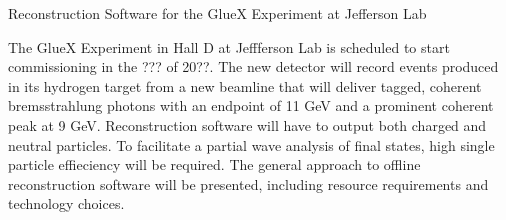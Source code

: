 Reconstruction Software for the GlueX Experiment at Jefferson Lab

The GlueX Experiment in Hall D at Jeffferson Lab is scheduled to start
commissioning in the ??? of 20??. The new detector will record events
produced in its hydrogen target from a new beamline that will deliver
tagged, coherent bremsstrahlung photons with an endpoint of 11 GeV and
a prominent coherent peak at 9 GeV.  Reconstruction software will have
to output both charged and neutral particles. To facilitate a partial
wave analysis of final states, high single particle effieciency will
be required. The general approach to offline reconstruction software
will be presented, including resource requirements and technology
choices.
